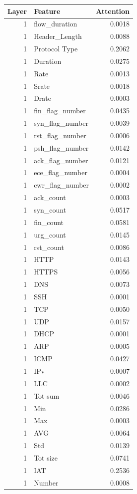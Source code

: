 \begin{tabular}{rlr}
\toprule
Layer & Feature & Attention \\
\midrule
1 & flow\_duration & 0.0018 \\
1 & Header\_Length & 0.0088 \\
1 & Protocol Type & 0.2062 \\
1 & Duration & 0.0275 \\
1 & Rate & 0.0013 \\
1 & Srate & 0.0018 \\
1 & Drate & 0.0003 \\
1 & fin\_flag\_number & 0.0435 \\
1 & syn\_flag\_number & 0.0039 \\
1 & rst\_flag\_number & 0.0006 \\
1 & psh\_flag\_number & 0.0142 \\
1 & ack\_flag\_number & 0.0121 \\
1 & ece\_flag\_number & 0.0004 \\
1 & cwr\_flag\_number & 0.0002 \\
1 & ack\_count & 0.0003 \\
1 & syn\_count & 0.0517 \\
1 & fin\_count & 0.0581 \\
1 & urg\_count & 0.0145 \\
1 & rst\_count & 0.0086 \\
1 & HTTP & 0.0143 \\
1 & HTTPS & 0.0056 \\
1 & DNS & 0.0073 \\
1 & SSH & 0.0001 \\
1 & TCP & 0.0050 \\
1 & UDP & 0.0157 \\
1 & DHCP & 0.0001 \\
1 & ARP & 0.0005 \\
1 & ICMP & 0.0427 \\
1 & IPv & 0.0007 \\
1 & LLC & 0.0002 \\
1 & Tot sum & 0.0046 \\
1 & Min & 0.0286 \\
1 & Max & 0.0003 \\
1 & AVG & 0.0064 \\
1 & Std & 0.0139 \\
1 & Tot size & 0.0741 \\
1 & IAT & 0.2536 \\
1 & Number & 0.0008 \\

\end{tabular}
